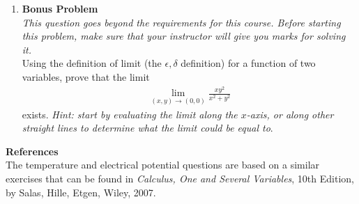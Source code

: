 \begin{enumerate}
\item 
\textbf{Bonus Problem}\\
\textit{This question goes beyond the requirements for this course. Before starting this problem, make sure that your instructor will give you marks for solving it.} \\
Using the definition of limit (the $\epsilon, \delta$ definition) for a function of two variables, prove that the limit
\begin{align*}
\lim_{(x,y)\rightarrow(0,0) } \frac{xy^2}{x^2+y^2}
\end{align*}
exists. \textit{Hint: start by evaluating the limit along the $x$-axis, or along other straight lines to determine what the limit could be equal to}.
\end{enumerate}
\noindent \textbf{References} \\
The temperature and electrical potential questions are based on a similar exercises that can be found in \textit{Calculus, One and Several Variables}, 10th Edition, by Salas, Hille, Etgen, Wiley, 2007.

\newpage
